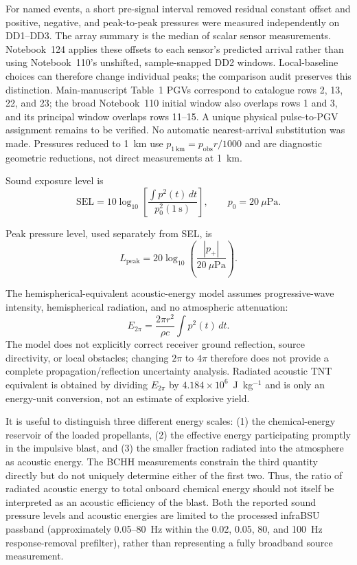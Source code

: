 \documentclass[]{seismica}
\begin{document}
For named events, a short pre-signal interval removed residual constant offset
and positive, negative, and peak-to-peak pressures were measured independently
on DD1--DD3. The array summary is the median of scalar sensor measurements.
Notebook~124 applies these offsets to each sensor's predicted arrival rather
than using Notebook~110's unshifted, sample-snapped DD2 windows. Local-baseline
choices can therefore change individual peaks; the comparison audit preserves
this distinction. Main-manuscript Table~1 PGVs correspond to catalogue rows 2,
13, 22, and 23; the broad Notebook~110 initial window also overlaps rows 1 and
3, and its principal window overlaps rows 11--15. A unique physical
pulse-to-PGV assignment remains to be verified. No automatic nearest-arrival
substitution was made. Pressures reduced to 1~km use
$p_{1\,\mathrm{km}}=p_{\mathrm{obs}}r/1000$ and are diagnostic geometric
reductions, not direct measurements at 1~km.

Sound exposure level is
\begin{equation}
 \mathrm{SEL}=10\log_{10}\left[
 \frac{\int p^2(t)\,dt}{p_0^2(1~\mathrm{s})}\right],
 \qquad p_0=20~\mu\mathrm{Pa}.
\end{equation}

Peak pressure level, used separately from SEL, is
\begin{equation}
 L_{\mathrm{peak}}=
 20\log_{10}\left(\frac{|p_+|}{20~\mu\mathrm{Pa}}\right).
\end{equation}

The hemispherical-equivalent acoustic-energy model assumes progressive-wave
intensity, hemispherical radiation, and no atmospheric attenuation:
\begin{equation}
 E_{2\pi}=\frac{2\pi r^2}{\rho c}\int p^2(t)\,dt.
\end{equation}
The model does not explicitly correct receiver ground reflection, source
directivity, or local obstacles; changing $2\pi$ to $4\pi$ therefore does not
provide a complete propagation/reflection uncertainty analysis. Radiated
acoustic TNT equivalent is obtained by dividing $E_{2\pi}$ by
$4.184\times10^6$~J~kg$^{-1}$ and is only an energy-unit conversion, not an
estimate of explosive yield.

It is useful to distinguish three different energy scales: (1) the
chemical-energy reservoir of the loaded propellants, (2) the effective energy
participating promptly in the impulsive blast, and (3) the smaller fraction
radiated into the atmosphere as acoustic energy. The BCHH measurements
constrain the third quantity directly but do not uniquely determine either of
the first two. Thus, the ratio of radiated acoustic energy to total onboard
chemical energy should not itself be interpreted as an acoustic efficiency of
the blast. Both the reported sound pressure levels and acoustic energies are
limited to the processed infraBSU passband (approximately 0.05--80~Hz within
the 0.02, 0.05, 80, and 100~Hz response-removal prefilter), rather than
representing a fully broadband source measurement.
\end{document}
